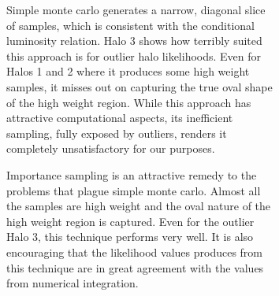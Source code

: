 \documentclass[\docopts]{\docclass}
\begin{document}
\begin{figure}[h!]
\begin{figure}[h!]

Simple monte carlo generates a narrow, diagonal slice of samples, which is consistent with the conditional luminosity relation.
Halo 3 shows how terribly suited this approach is for outlier halo likelihoods.
Even for Halos 1 and 2 where it produces some high weight samples, it misses out on capturing the true oval shape of the high weight region.
While this approach has attractive computational aspects, its inefficient sampling, fully exposed by outliers, renders it completely unsatisfactory for our purposes.

Importance sampling is an attractive remedy to the problems that plague simple monte carlo.
Almost all the samples are high weight and the oval nature of the high weight region is captured.
Even for the outlier Halo 3, this technique performs very well.
It is also encouraging that the likelihood values produces from this technique are in great agreement with the values from numerical integration.


\end{figure}
\end{figure}
\end{document}
